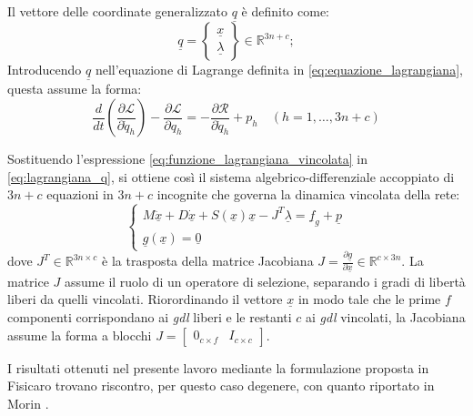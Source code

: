 Il vettore delle coordinate generalizzato $\underline{q}$ è definito come:
\begin{equation}
   \underline{q} =
   \left\{
   \begin{array}{c}
   \underline{x} \\ 
   \underline{\lambda}
   \end{array}
   \right\} \in \mathbb{R}^{3n+c};
\end{equation}
Introducendo $\underline{q}$ nell'equazione di Lagrange definita in \eqref{eq:equazione_lagrangiana}, questa assume la forma:
\begin{equation}
   \frac{d}{dt} \left( \frac{\partial \mathcal{L}}{\partial \dot{q}_h}\right) - \frac{\partial \mathcal{L}}{\partial q_h} = - \frac{\partial \mathcal{R}}{\partial \dot{q}_h} + p_h \quad (h = 1, \dots, 3n+c)
   \label{eq:lagrangiana_q}
\end{equation}

Sostituendo l'espressione \eqref{eq:funzione_lagrangiana_vincolata} in \eqref{eq:lagrangiana_q}, si ottiene così il sistema algebrico-differenziale accoppiato di $3n + c$ equazioni in $3n+c$ incognite che governa la dinamica vincolata della rete:
\begin{equation}
   \begin{cases}
      M \ddot{\underline{x}} + D \dot{\underline{x}} + S(\underline{x})\underline{x} - J^T \underline{\lambda} = \underline{f}_g + \underline{p} \\
      \underline{g}(\underline{x}) = \underline{0}
   \end{cases}
   \label{eq:formulazione_dinamica_vincoli}
\end{equation}
dove $J^T \in \mathbb{R}^{3n \times c}$ è la trasposta della matrice Jacobiana $J = \frac{\partial \underline{g}}{\partial \underline{x}} \in \mathbb{R}^{c \times 3n}$. La matrice $J$ assume il ruolo di un operatore di selezione, separando i gradi di libertà liberi da quelli vincolati. Riorordinando il vettore $\underline{x}$ in modo tale che le prime $f$ componenti corrispondano ai \textit{gdl} liberi e le restanti $c$ ai \textit{gdl}  vincolati, la Jacobiana assume la forma a blocchi $J = \begin{bmatrix} 0_{c \times f} & I_{c \times c} \end{bmatrix}$.

I risultati ottenuti nel presente lavoro mediante la formulazione proposta in Fisicaro \cite{Fisicaro} trovano riscontro, per questo caso degenere, con quanto riportato in Morin \cite{Morin2008}.

